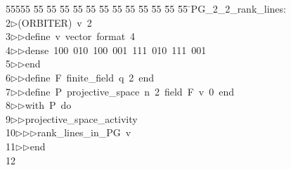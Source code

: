 %
%
\begin{tabbing}
55555 \= 55 \= 55 \= 55 \= 55 \= 55 \= 55 \= 55 \= 55 \= 55 \= 55 \= 55 \= 55 \= \>PG\_2\_2\_rank\_lines:\\[0pt]
2\>$\triangleright$\>(ORBITER)\ v\ 2\ \\[0pt]
3\>$\triangleright$\>$\triangleright$\>define\ v\ vector\ format\ 4\ \\[0pt]
4\>$\triangleright$\>$\triangleright$\>dense\ 100\ 010\ 100\ 001\ 111\ 010\ 111\ 001\ \\[0pt]
5\>$\triangleright$\>$\triangleright$\>end\ \\[0pt]
6\>$\triangleright$\>$\triangleright$\>define\ F\ finite\_field\ q\ 2\ end\ \\[0pt]
7\>$\triangleright$\>$\triangleright$\>define\ P\ projective\_space\ n\ 2\ field\ F\ v\ 0\ end\ \\[0pt]
8\>$\triangleright$\>$\triangleright$\>with\ P\ do\ \\[0pt]
9\>$\triangleright$\>$\triangleright$\>projective\_space\_activity\ \\[0pt]
10\>$\triangleright$\>$\triangleright$\>$\triangleright$\>rank\_lines\_in\_PG\ v\ \\[0pt]
11\>$\triangleright$\>$\triangleright$\>end\ \\[0pt]
12\>\end{tabbing}
